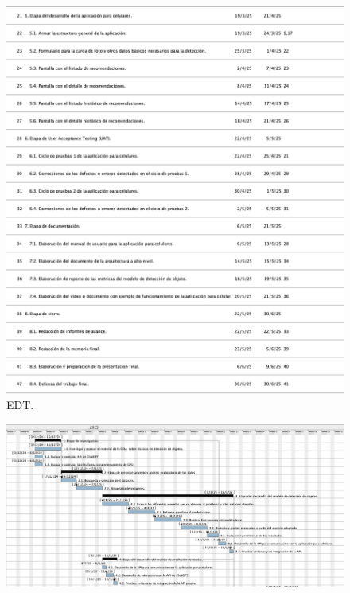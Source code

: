 \documentclass[
11pt, %
]{charter}
\begin{document}
\begin{figure}[H]
\centering 
\includegraphics[width=1\textwidth]{./GanttActividades2.png}
\caption{EDT.}
\label{fig:AoN}
\end{figure}


\begin{landscape}
\begin{figure}[H]
\centering 
\includegraphics[width=1.55\textwidth]{./Gantt1.png}
\label{fig:AoN}
\end{figure}
\end{landscape}
\end{document}
